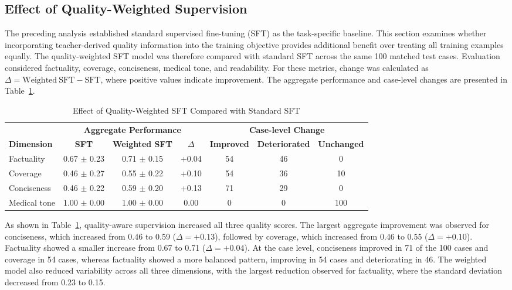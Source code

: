 \documentclass[ %
                    author={Aman Kumar Singh},
                supervisor={Dr. Edwin Simpson},
                    degree={MSc},
                     title={Quality-Aware Knowledge Distillation of Large Language Models for Efficient Personalised Clinical Report Generation},
                  subtitle={},
                      type={},
                      year={2021}]{dissertation}
\begin{document}
\subsection{Effect of Quality-Weighted Supervision}
\label{sec:effect_quality_weighted}

The preceding analysis established standard supervised fine-tuning (SFT)
as the task-specific baseline. This section examines whether incorporating
teacher-derived quality information into the training objective provides
additional benefit over treating all training examples equally. The
quality-weighted SFT model was therefore compared with standard SFT across
the same 100 matched test cases. Evaluation considered factuality,
coverage, conciseness, medical tone, and readability. For these metrics,
change was calculated as
$\Delta = \mathrm{Weighted\ SFT} - \mathrm{SFT}$, where positive values
indicate improvement. The aggregate performance and case-level changes are
presented in Table~\ref{tab:sft_weighted_comparison}.
\vspace{-15pt}
\begin{table}[htbp]
\centering
\footnotesize
\caption{Effect of Quality-Weighted SFT Compared with Standard SFT}
\label{tab:sft_weighted_comparison}
\begin{tabular}{lccc|ccc}
\hline
& \multicolumn{3}{c|}{\textbf{Aggregate Performance}}
& \multicolumn{3}{c}{\textbf{Case-level Change}} \\
\cline{2-7}
\textbf{Dimension}
& \textbf{SFT}
& \textbf{Weighted SFT}
& \textbf{$\Delta$}
& \textbf{Improved}
& \textbf{Deteriorated}
& \textbf{Unchanged} \\
\hline

Factuality
& 0.67 $\pm$ 0.23
& 0.71 $\pm$ 0.15
& +0.04
& 54
& 46
& 0 \\

Coverage
& 0.46 $\pm$ 0.27
& 0.55 $\pm$ 0.22
& +0.10
& 54
& 36
& 10 \\

Conciseness
& 0.46 $\pm$ 0.22
& 0.59 $\pm$ 0.20
& +0.13
& 71
& 29
& 0 \\

Medical tone
& 1.00 $\pm$ 0.00
& 1.00 $\pm$ 0.00
& 0.00
& 0
& 0
& 100 \\

\hline
\end{tabular}
\end{table}

As shown in Table~\ref{tab:sft_weighted_comparison}, quality-aware
supervision increased all three quality scores. The largest aggregate
improvement was observed for conciseness, which increased from 0.46 to
0.59 ($\Delta=+0.13$), followed by coverage, which increased from 0.46
to 0.55 ($\Delta=+0.10$). Factuality showed a smaller increase from
0.67 to 0.71 ($\Delta=+0.04$). At the case level, conciseness improved
in 71 of the 100 cases and coverage in 54 cases, whereas factuality
showed a more balanced pattern, improving in 54 cases and deteriorating
in 46. The weighted model also reduced variability across all three
dimensions, with the largest reduction observed for factuality, where
the standard deviation decreased from 0.23 to 0.15.
\end{document}
